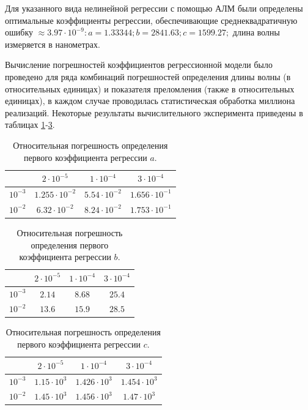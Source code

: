\documentclass[11pt,a4paper]{article}
\theoremstyle{definition}
\begin{document}
Для указанного вида нелинейной регрессии с помощью АЛМ были
определены оптимальные коэффициенты регрессии, обеспечивающие
среднеквадратичную ошибку $\approx 3.97 \cdot 10^{-9}: a = 1.33344; b = 2841.63; c = 1599.27;$
длина волны измеряется в нанометрах.

Вычисление погрешностей коэффициентов регрессионной модели было
проведено для ряда комбинаций погрешностей определения длины волны (в
относительных единицах) и показателя преломления (также в относительных
единицах), в каждом случае проводилась статистическая обработка миллиона
реализаций. Некоторые результаты вычислительного эксперимента приведены
в таблицах \ref{tabl:inacc_a}-\ref{tabl:inacc_c}.

\begin{table}[h]
  \center
  \begin{tabular}{| l | c | c | c |} \hline
					& $2 \cdot 10^{-5}$		& $1 \cdot 10^{-4}$		& $3 \cdot 10^{-4}$		\\ \hline
	$10^{-3}$		& $1.255 \cdot 10^{-2}$	& $5.54 \cdot 10^{-2}$	& $1.656 \cdot 10^{-1}$	\\ \hline
	$10^{-2}$		& $6.32 \cdot 10^{-2}$ 	& $8.24 \cdot 10^{-2}$	& $1.753 \cdot 10^{-1}$	\\ \hline
  \end{tabular}
  \caption{Относительная погрешность определения первого коэффициента регрессии $a$.}
  \label{tabl:inacc_a}
\end{table}
\begin{table}[h]
  \center
  \begin{tabular}{| l | c | c | c |} \hline
					& $2 \cdot 10^{-5}$		& $1 \cdot 10^{-4}$		& $3 \cdot 10^{-4}$		\\ \hline
	$10^{-3}$		& $2.14$				& $8.68$				& $25.4$				\\ \hline
	$10^{-2}$		& $13.6$				& $15.9$				& $28.5$				\\ \hline
  \end{tabular}
  \caption{Относительная погрешность определения первого коэффициента регрессии $b$.}
  \label{tabl:inacc_b}
\end{table}
\begin{table}[h]
  \center
  \begin{tabular}{| l | c | c | c |} \hline
					& $2 \cdot 10^{-5}$		& $1 \cdot 10^{-4}$		& $3 \cdot 10^{-4}$		\\ \hline
    $10^{-3}$		& $1.15 \cdot 10^3$		& $1.426 \cdot 10^3$	& $1.454 \cdot 10^3$	\\ \hline
	$10^{-2}$		& $1.45 \cdot 10^3$		& $1.456 \cdot 10^3$	& $1.47 \cdot 10^3$		\\ \hline
  \end{tabular}
  \caption{Относительная погрешность определения первого коэффициента регрессии $c$.}
  \label{tabl:inacc_c}
\end{table}
\end{document}
